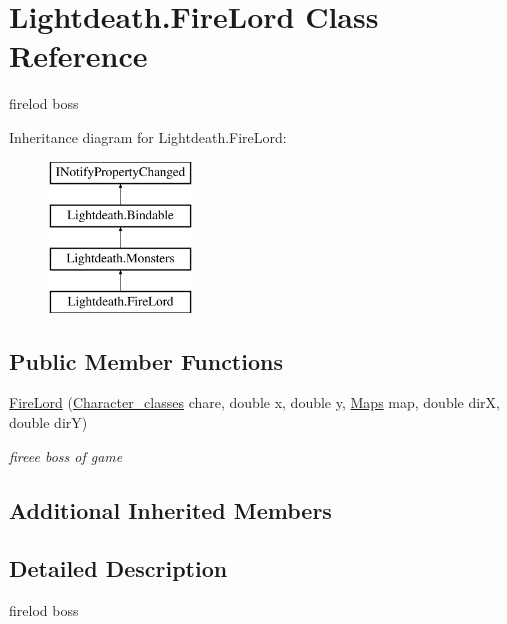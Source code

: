 \hypertarget{class_lightdeath_1_1_fire_lord}{}\section{Lightdeath.\+Fire\+Lord Class Reference}
\label{class_lightdeath_1_1_fire_lord}


firelod boss  


Inheritance diagram for Lightdeath.\+Fire\+Lord\+:\begin{figure}[H]
\begin{center}
\leavevmode
\includegraphics[height=4.000000cm]{class_lightdeath_1_1_fire_lord}
\end{center}
\end{figure}
\subsection*{Public Member Functions}
\begin{DoxyCompactItemize}
\item 
\hyperlink{class_lightdeath_1_1_fire_lord_ad97a3683526e8b1756a3fe9cd73039b8}{Fire\+Lord} (\hyperlink{class_lightdeath_1_1_character__classes}{Character\+\_\+classes} chare, double x, double y, \hyperlink{class_lightdeath_1_1_maps}{Maps} map, double dirX, double dirY)
\begin{DoxyCompactList}\small\item\em fireee boss of game \end{DoxyCompactList}\end{DoxyCompactItemize}
\subsection*{Additional Inherited Members}


\subsection{Detailed Description}
firelod boss 



